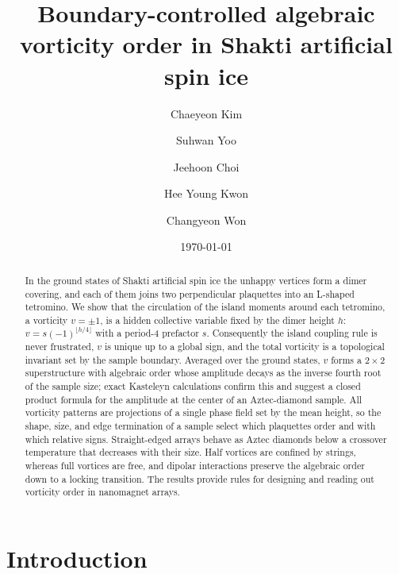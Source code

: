 \documentclass[aps,prb,twocolumn,floatfix,longbibliography]{revtex4-2}
\newcommand{\floor}[1]{\lfloor #1\rfloor}
\begin{document}
\title{Boundary-controlled algebraic vorticity order in Shakti artificial spin ice}

\author{Chaeyeon Kim}
\author{Suhwan Yoo}
\author{Jeehoon Choi}
\author{Hee Young Kwon}
\author{Changyeon Won}

\date{\today}

\begin{abstract}
In the ground states of Shakti artificial spin ice the unhappy vertices form a dimer covering, and each of them joins two perpendicular plaquettes into an L-shaped tetromino. We show that the circulation of the island moments around each tetromino, a vorticity $v=\pm1$, is a hidden collective variable fixed by the dimer height $h$: $v=s(-1)^{\floor{h/4}}$ with a period-4 prefactor $s$. Consequently the island coupling rule is never frustrated, $v$ is unique up to a global sign, and the total vorticity is a topological invariant set by the sample boundary. Averaged over the ground states, $v$ forms a $2\times2$ superstructure with algebraic order whose amplitude decays as the inverse fourth root of the sample size; exact Kasteleyn calculations confirm this and suggest a closed product formula for the amplitude at the center of an Aztec-diamond sample. All vorticity patterns are projections of a single phase field set by the mean height, so the shape, size, and edge termination of a sample select which plaquettes order and with which relative signs. Straight-edged arrays behave as Aztec diamonds below a crossover temperature that decreases with their size. Half vortices are confined by strings, whereas full vortices are free, and dipolar interactions preserve the algebraic order down to a locking transition. The results provide rules for designing and reading out vorticity order in nanomagnet arrays.
\end{abstract}

\maketitle

\section{Introduction}
\end{document}
